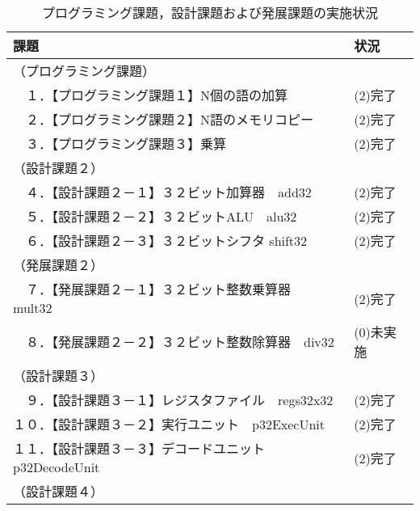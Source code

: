 \documentclass{jarticle}[11pt]
\begin{document}
\begin{table*}[h] %
  \caption{プログラミング課題，設計課題および発展課題の実施状況}
  \label{プログラミング課題，設計課題および発展課題の実施状況}
  \begin{center}
  \begin{tabular}{l|l}
  \hline \hline
  課題 &
  状況
  \\ \hline \hline
  
  （プログラミング課題）&
  \\

  　１．【プログラミング課題１】N個の語の加算&
  (2)完了
  \\ 

  　２．【プログラミング課題２】N語のメモリコピー&
  (2)完了
  \\ 

  　３．【プログラミング課題３】乗算&
  (2)完了
  \\

  （設計課題２）&
  \\

  　４．【設計課題２－１】３２ビット加算器　add32&
  (2)完了
  \\ 

  　５．【設計課題２－２】３２ビットALU　alu32&
  (2)完了
  \\ 

  　６．【設計課題２－３】３２ビットシフタ shift32&
  (2)完了
  \\ 

  （発展課題２）&
  \\ 

  　７．【発展課題２－１】３２ビット整数乗算器　mult32&
  (2)完了
  \\

  　８．【発展課題２－２】３２ビット整数除算器　div32&
  (0)未実施
  \\

  （設計課題３）&
  \\

  　９．【設計課題３－１】レジスタファイル　regs32x32&
  (2)完了
  \\ 

  １０．【設計課題３－２】実行ユニット　p32ExecUnit&
  (2)完了
  \\ 

  １１．【設計課題３－３】デコードユニット p32DecodeUnit&
  (2)完了
  \\ 

  （設計課題４）&
  \\


\end{tabular}
\end{center}
\end{table*}
\end{document}
